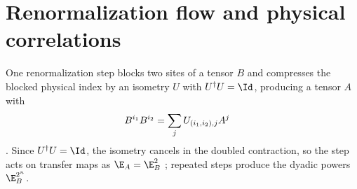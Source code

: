 \section{Renormalization flow and physical correlations}

One renormalization step blocks two sites of a tensor $B$ and compresses the
blocked physical index by an isometry $U$ with $U^\dagger U=\Id$, producing a
tensor $A$ with
\begin{align}
    B^{i_1}B^{i_2} & =\sum_j U_{(i_1,i_2),j}A^j
    \notag
\end{align}
\cite[lines~389--394]{Cirac2016MPDO_arXiv}. Since $U^\dagger U=\Id$, the
isometry cancels in the doubled contraction, so the step acts on transfer maps
as $\E_A=\E_B^2$ \cite[line~1209]{Cirac2016MPDO_arXiv}; repeated steps
produce the dyadic powers $\E_B^{2^n}$.

